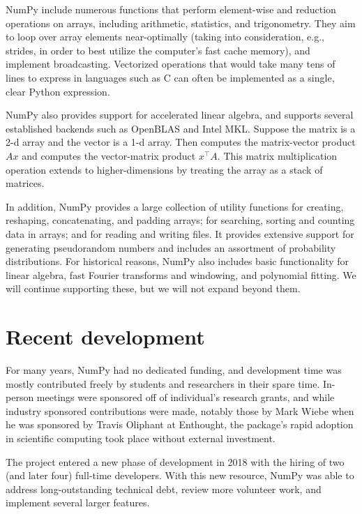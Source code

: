 NumPy include numerous functions that perform element-wise and reduction operations on arrays, including arithmetic, statistics, and trigonometry.  They aim to loop over array elements near-optimally (taking into consideration, e.g., strides, in order to best utilize the computer's fast cache memory), and implement broadcasting.  Vectorized operations that would take many tens of lines to express in languages such as C can often be implemented as a single, clear Python expression.

NumPy also provides support for accelerated linear algebra, and supports several established backends such as OpenBLAS and Intel MKL.  Suppose the matrix  is a 2-d array and the vector  is a 1-d array.  Then  computes the matrix-vector product $Ax$ and
 computes the vector-matrix product $x^\top A$.
This matrix multiplication operation extends to higher-dimensions by
treating the array as a stack of matrices.

In addition, NumPy provides a large collection of utility functions for creating, reshaping, concatenating, and padding arrays; for searching, sorting and counting data in arrays; and for reading and writing files.  It provides extensive support for generating pseudorandom numbers and includes an assortment of probability distributions.  For historical reasons, NumPy also includes basic functionality for linear algebra, fast Fourier transforms and windowing, and polynomial fitting.  We will continue supporting these, but we will not expand beyond them.

\section*{Recent development}

For many years, NumPy had no dedicated funding, and development time
was mostly contributed freely by students and researchers in their
spare time.  In-person meetings were sponsored off of individual's
research grants, and while industry sponsored contributions were made,
notably those by Mark Wiebe when he was sponsored by Travis Oliphant
at Enthought, the package's rapid adoption in scientific
computing took place without external investment.

The project entered a new phase of development in 2018 with the hiring of two (and later four) full-time developers.  With this new resource, NumPy was able to address long-outstanding technical debt, review more volunteer work, and implement several larger features.

